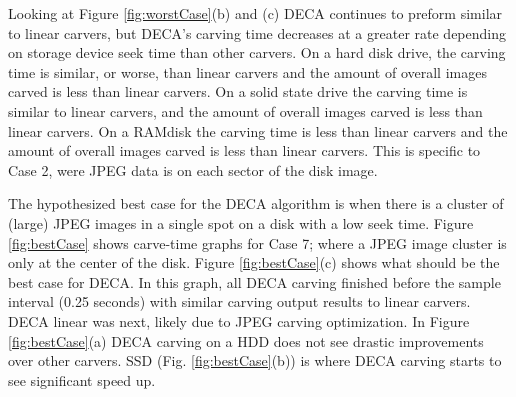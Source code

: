 \documentclass[final,5p,times,twocolumn,authoryear]{elsarticle}
\begin{document}
Looking at Figure \ref{fig:worstCase}(b) and (c) DECA continues to preform similar to linear carvers, but DECA's carving time decreases at a greater rate depending on storage device seek time than other carvers. On a hard disk drive, the carving time is similar, or worse, than linear carvers and the amount of overall images carved is less than linear carvers. On a solid state drive the carving time is similar to linear carvers, and the amount of overall images carved is less than linear carvers. On a RAMdisk the carving time is less than linear carvers and the amount of overall images carved is less than linear carvers. This is specific to Case 2, were JPEG data is on each sector of the disk image.

The hypothesized best case for the DECA algorithm is when there is a cluster of (large) JPEG images in a single spot on a disk with a low seek time. Figure \ref{fig:bestCase} shows carve-time graphs for Case 7; where a JPEG image cluster is only at the center of the disk. Figure \ref{fig:bestCase}(c) shows what should be the best case for DECA. In this graph, all DECA carving finished before the sample interval (0.25 seconds) with similar carving output results to linear carvers. DECA linear was next, likely due to JPEG carving optimization. In Figure \ref{fig:bestCase}(a) DECA carving on a HDD does not see drastic improvements over other carvers. SSD (Fig. \ref{fig:bestCase}(b)) is where DECA carving starts to see significant speed up.
\end{document}
